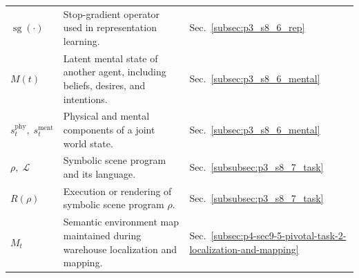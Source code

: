 \begin{longtable}{lll}
$\operatorname{sg}(\cdot)$ & Stop-gradient operator used in representation learning. & Sec.~\ref{subsec:p3_s8_6_rep} \\
$M(t)$ & Latent mental state of another agent, including beliefs, desires, and intentions. & Sec.~\ref{subsec:p3_s8_6_mental} \\
$s_t^{\mathrm{phy}},\;s_t^{\mathrm{ment}}$ & Physical and mental components of a joint world state. & Sec.~\ref{subsec:p3_s8_6_mental} \\
$\rho,\;\mathcal{L}$ & Symbolic scene program and its language. & Sec.~\ref{subsubsec:p3_s8_7_task} \\
$R(\rho)$ & Execution or rendering of symbolic scene program $\rho$. & Sec.~\ref{subsubsec:p3_s8_7_task} \\
$M_t$ & Semantic environment map maintained during warehouse localization and mapping. & Sec.~\ref{subsec:p4-sec9-5-pivotal-task-2-localization-and-mapping} \\
\end{longtable}


    



    
    


